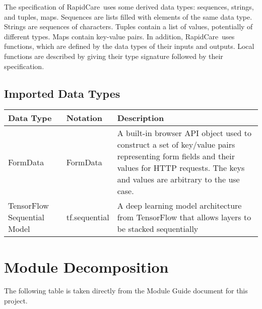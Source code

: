 \documentclass[12pt, titlepage]{article}
\newcommand{\projname}{RapidCare}
\begin{document}
\noindent
The specification of \projname \ uses some derived data types: sequences, strings, and
tuples, maps. Sequences are lists filled with elements of the same data type. Strings
are sequences of characters. Tuples contain a list of values, potentially of
different types. Maps contain key-value pairs. In addition, \projname \ uses functions, which
are defined by the data types of their inputs and outputs. Local functions are
described by giving their type signature followed by their specification.

\subsection{Imported Data Types}

\begin{center}
\renewcommand{\arraystretch}{1.2}
\noindent 
\begin{tabular}{l l p{7.5cm}} 
\toprule 
\textbf{Data Type} & \textbf{Notation} & \textbf{Description}\\ 
\midrule
FormData & FormData & A built-in browser API object used to construct a set of key/value pairs representing form fields and their values for HTTP requests. The keys and values are arbitrary to the use case.\\
TensorFlow Sequential Model & tf.sequential & A deep learning model architecture from TensorFlow that allows layers to be stacked sequentially\\
\bottomrule
\end{tabular} 
\end{center}

\section{Module Decomposition}

The following table is taken directly from the Module Guide document for this project.
\end{document}
